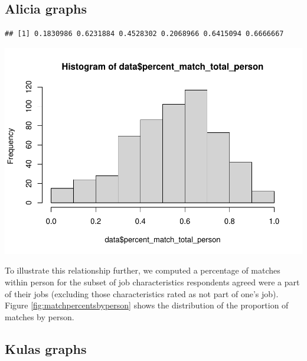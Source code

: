 \documentclass[
  man]{apa6}
\begin{document}
\hypertarget{alicia-graphs}{%
\subsection{Alicia graphs}\label{alicia-graphs}}

\begin{verbatim}
## [1] 0.1830986 0.6231884 0.4528302 0.2068966 0.6415094 0.6666667
\end{verbatim}

\includegraphics{Submission_ResourceCount_files/figure-latex/matchpercentsbyperson-1.pdf}

To illustrate this relationship further, we computed a percentage of matches within person for the subset of job characteristics respondents agreed were a part of their jobs (excluding those characteristics rated as not part of one's job). Figure \ref{fig:matchpercentsbyperson} shows the distribution of the proportion of matches by person.

\hypertarget{kulas-graphs}{%
\subsection{Kulas graphs}\label{kulas-graphs}}
\end{document}
